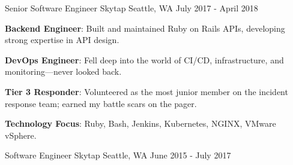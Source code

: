 \begin{cventries}
  \cventry
    {Senior Software Engineer} %
    {Skytap} %
    {Seattle, WA} %
    {July 2017 - April 2018} %
    {
      \begin{cvitems} %
        \item {\textbf{Backend Engineer}: Built and maintained Ruby on Rails APIs, developing strong expertise in API design.}
        \item {\textbf{DevOps Engineer}: Fell deep into the world of CI/CD, infrastructure, and monitoring—never looked back.}
        \item {\textbf{Tier 3 Responder}: Volunteered as the most junior member on the incident response team; earned my battle scars on the pager.}
        \item {\textbf{Technology Focus}: Ruby, Bash, Jenkins, Kubernetes, NGINX, VMware vSphere.}
      \end{cvitems}
    }

  \cventry
    {Software Engineer} %
    {Skytap} %
    {Seattle, WA} %
    {June 2015 - July 2017} %
    {}

\end{cventries}
